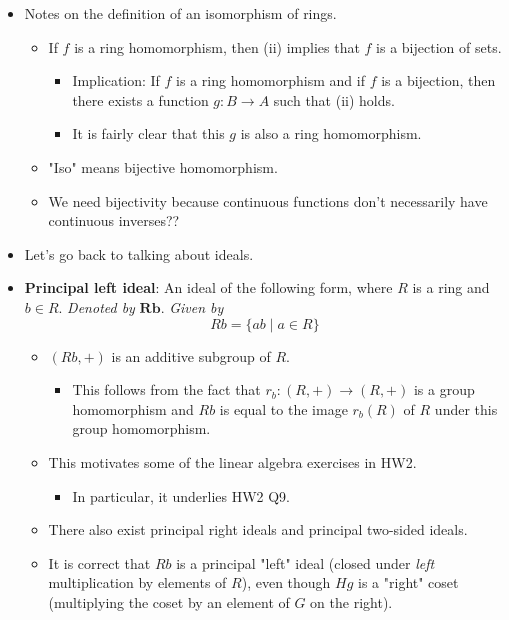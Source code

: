 \documentclass[../notes.tex]{subfiles}
\begin{document}
\begin{itemize}
    \item Notes on the definition of an isomorphism of rings.
    \begin{itemize}
        \item If $f$ is a ring homomorphism, then (ii) implies that $f$ is a bijection of sets.
        \begin{itemize}
            \item Implication: If $f$ is a ring homomorphism and if $f$ is a bijection, then there exists a function $g:B\to A$ such that (ii) holds.
            \item It is fairly clear that this $g$ is also a ring homomorphism.
        \end{itemize}
        \item "Iso" means bijective homomorphism.
        \item We need bijectivity because continuous functions don't necessarily have continuous inverses??
    \end{itemize}
    \item Let's go back to talking about ideals.
    \item \textbf{Principal left ideal}: An ideal of the following form, where $R$ is a ring and $b\in R$. \emph{Denoted by} $\bm{Rb}$. \emph{Given by}
    \begin{equation*}
        Rb = \{ab\mid a\in R\}
    \end{equation*}
    \begin{itemize}
        \item $(Rb,+)$ is an additive subgroup of $R$.
        \begin{itemize}
            \item This follows from the fact that $r_b:(R,+)\to(R,+)$ is a group homomorphism and $Rb$ is equal to the image $r_b(R)$ of $R$ under this group homomorphism.
        \end{itemize}
        \item This motivates some of the linear algebra exercises in HW2.
        \begin{itemize}
            \item In particular, it underlies HW2 Q9.
        \end{itemize}
        \item There also exist principal right ideals and principal two-sided ideals.
        \item It is correct that $Rb$ is a principal "left" ideal (closed under \emph{left} multiplication by elements of $R$), even though $Hg$ is a "right" coset (multiplying the coset by an element of $G$ on the right).

\end{itemize}
\end{itemize}
\end{document}
